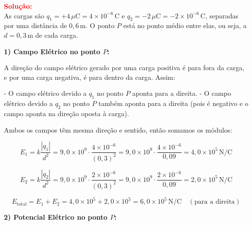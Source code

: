 \documentclass[a4paper,12pt]{article}
\begin{document}
\begin{flushleft}
\begin{center}
\end{center}

\vspace{0.5cm}

\textcolor{red}{\textbf{Solução:}}\\

As cargas são \( q_1 = +4\,\mu\text{C} = 4 \times 10^{-6}\,\text{C} \) e \( q_2 = -2\,\mu\text{C} = -2 \times 10^{-6}\,\text{C} \), 
separadas por uma distância de \( 0{,}6\,\text{m} \). O ponto \( P \) está no ponto médio entre elas, ou seja, a \( d = 0{,}3\,\text{m} \) de cada carga.

\vspace{0.5cm}
\textbf{1) Campo Elétrico no ponto \( P \):}

A direção do campo elétrico gerado por uma carga positiva é para fora da carga, e por uma carga negativa, é para dentro da carga. Assim:

- O campo elétrico devido a \( q_1 \) no ponto \( P \) aponta para a direita.
- O campo elétrico devido a \( q_2 \) no ponto \( P \) também aponta para a direita (pois é negativo e o campo aponta na direção oposta à carga).

Ambos os campos têm mesma direção e sentido, então somamos os módulos:

\[
E_1 = k \frac{|q_1|}{d^2} = 9{,}0 \times 10^9 \cdot \frac{4 \times 10^{-6}}{(0{,}3)^2}
= 9{,}0 \times 10^9 \cdot \frac{4 \times 10^{-6}}{0{,}09}
= 4{,}0 \times 10^5\,\text{N/C}
\]

\[
E_2 = k \frac{|q_2|}{d^2} = 9{,}0 \times 10^9 \cdot \frac{2 \times 10^{-6}}{(0{,}3)^2}
= 9{,}0 \times 10^9 \cdot \frac{2 \times 10^{-6}}{0{,}09}
= 2{,}0 \times 10^5\,\text{N/C}
\]

\[
E_{\text{total}} = E_1 + E_2 = 4{,}0 \times 10^5 + 2{,}0 \times 10^5 = 6{,}0 \times 10^5\,\text{N/C} \quad (\text{para a direita})
\]

\vspace{0.5cm}
\textbf{2) Potencial Elétrico no ponto \( P \):}


\end{flushleft}
\end{document}
